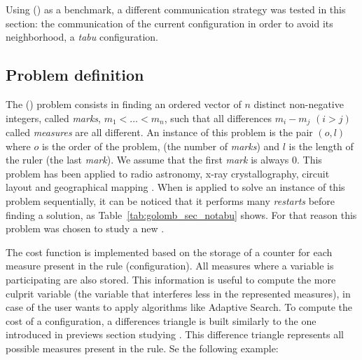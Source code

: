 Using \grp{} (\GRP) as a benchmark, a different communication strategy was tested in this section: the communication of the current configuration in order to avoid its neighborhood, \ie a {\it tabu} configuration.

\subsection{Problem definition}

The \grp{} (\GRP) problem consists in finding an ordered vector of $n$ distinct non-negative integers, called \textit{marks}, $m_1 < \dots < m_n$, such that all differences $m_i - m_j$ $(i > j)$ called \textit{measures} are all different. An instance of this problem is the pair $(o,l)$ where $o$ is the order of the problem, (\ie the number of \textit{marks}) and $l$ is the length of the ruler (\ie the last {\it mark}). We assume that the first \textit{mark} is always 0. This problem has been applied to radio astronomy, x-ray crystallography, circuit layout and geographical mapping \cite{Soliday1995}. 
When \posl{} is applied to solve an instance of this problem sequentially, it can be noticed that it performs many {\it restarts} before finding a solution, as Table~\ref{tab:golomb_sec_notabu} shows. For that reason this problem was chosen to study a new \commstr.

The cost function is implemented based on the storage of a counter for each measure present in the rule (configuration). All measures where a variable is participating are also stored. This information is useful to compute the more culprit variable (the variable that interferes less in the represented measures), in case of the user wants to apply algorithms like Adaptive Search. 
To compute the cost of a configuration, a differences triangle is built similarly to the one introduced in previews section studying \carrp. This difference triangle represents all possible measures present in the rule. Se the following example:

